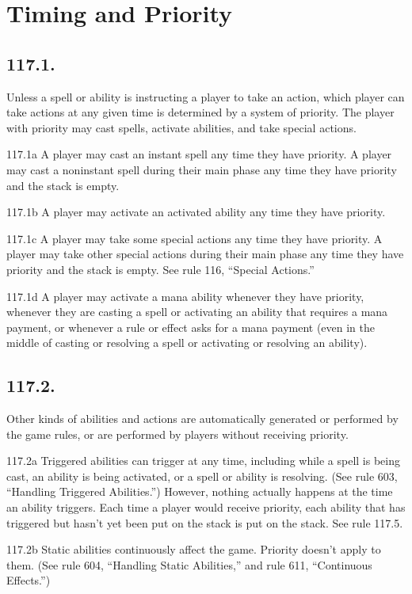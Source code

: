 \section{Timing and Priority}
\subsection*{117.1.}
Unless a spell or ability is instructing a player to take an action, which player can take actions at any given time is determined by a system of priority. The player with priority may cast spells, activate abilities, and take special actions.

117.1a A player may cast an instant spell any time they have priority. A player may cast a noninstant spell during their main phase any time they have priority and the stack is empty.

117.1b A player may activate an activated ability any time they have priority.

117.1c A player may take some special actions any time they have priority. A player may take other special actions during their main phase any time they have priority and the stack is empty. See rule 116, “Special Actions.”

117.1d A player may activate a mana ability whenever they have priority, whenever they are casting a spell or activating an ability that requires a mana payment, or whenever a rule or effect asks for a mana payment (even in the middle of casting or resolving a spell or activating or resolving an ability).

\subsection*{117.2.}
Other kinds of abilities and actions are automatically generated or performed by the game rules, or are performed by players without receiving priority.

117.2a Triggered abilities can trigger at any time, including while a spell is being cast, an ability is being activated, or a spell or ability is resolving. (See rule 603, “Handling Triggered Abilities.”) However, nothing actually happens at the time an ability triggers. Each time a player would receive priority, each ability that has triggered but hasn’t yet been put on the stack is put on the stack. See rule 117.5.

117.2b Static abilities continuously affect the game. Priority doesn’t apply to them. (See rule 604, “Handling Static Abilities,” and rule 611, “Continuous Effects.”)

